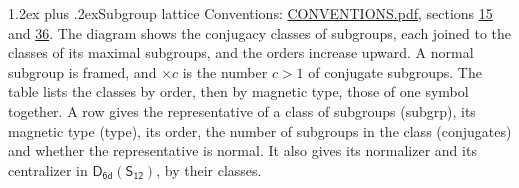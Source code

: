 \documentclass[10pt,a4paper]{article}
\makeatletter
\renewcommand\section{\@startsection{section}{1}{\z@}{-3ex plus -1ex minus -.2ex}%
  {1.2ex plus .2ex}{\normalfont\large\sffamily\bfseries\color{parttitle}}}
\numberwithin{equation}{section}
\newcommand{\grp}[1]{\mathsf{#1}}
\makeatother
\begin{document}
\section{Subgroup lattice}\label{s:subgroups}
Conventions: \href{../../CONVENTIONS.pdf}{CONVENTIONS.pdf}, sections \href{../../../rotation/CONVENTIONS.pdf\#conv.15}{15} and \href{../../CONVENTIONS.pdf\#conv.36}{36}.
The diagram shows the conjugacy classes of subgroups, each joined to the classes of its maximal subgroups, and the orders increase upward. \label{n:index.conjugates.c}\label{n:mark.conjugates}A normal subgroup is framed, and ${\times}c$ is the number $c > 1$ of conjugate subgroups. The table lists the classes by order, then by magnetic type, those of one symbol together. \label{n:head.subgroup}\label{n:head.magnetic.type}\label{n:head.order}\label{n:head.conjugates}\label{n:head.normal}A row gives the representative of a class of subgroups (subgrp), its magnetic type (type), its order, the number of subgroups in the class (conjugates) and whether the representative is normal. \label{n:head.normalizer}\label{n:head.centralizer}It also gives its normalizer and its centralizer in $\grp{D_{6d}}(\grp{S_{12}})$, by their classes. 
\end{document}
